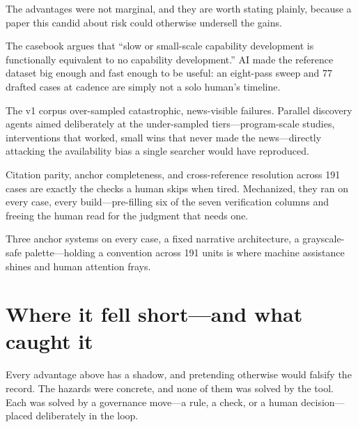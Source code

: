 \documentclass[11pt]{article}
\begin{document}
The advantages were not marginal, and they are worth stating plainly, because a paper this candid about risk could otherwise undersell the gains.

\begin{description}[leftmargin=1.1em,itemsep=4pt,topsep=3pt,font=\color{lensgood}\bfseries]
  \item[Speed and scale, together.] The casebook argues that ``slow or small-scale capability development is functionally equivalent to no capability development.'' AI made the reference dataset big enough and fast enough to be useful: an eight-pass sweep and 77 drafted cases at cadence are simply not a solo human's timeline.
  \item[Breadth that fights a known bias.] The v1 corpus over-sampled catastrophic, news-visible failures. Parallel discovery agents aimed deliberately at the under-sampled tiers---program-scale studies, interventions that worked, small wins that never made the news---directly attacking the availability bias a single searcher would have reproduced.
  \item[Tireless mechanical rigor.] Citation parity, anchor completeness, and cross-reference resolution across 191 cases are exactly the checks a human skips when tired. Mechanized, they ran on every case, every build---pre-filling six of the seven verification columns and freeing the human read for the judgment that needs one.
  \item[Structural consistency.] Three anchor systems on every case, a fixed narrative architecture, a grayscale-safe palette---holding a convention across 191 units is where machine assistance shines and human attention frays.
\end{description}

\section{Where it fell short---and what caught it}

Every advantage above has a shadow, and pretending otherwise would falsify the record. The hazards were concrete, and none of them was solved by the tool. Each was solved by a governance move---a rule, a check, or a human decision---placed deliberately in the loop.
\end{document}
